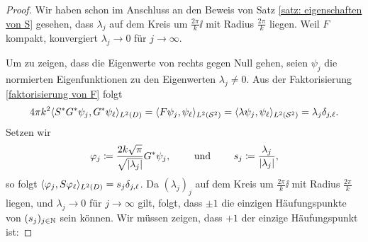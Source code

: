\begin{proof}
	Wir haben schon im Anschluss an den Beweis von Satz \ref{satz: eigenschaften von S} gesehen, dass \(\lambda_j\) auf dem Kreis um \(\frac{2\pi}{k}\ii\) mit Radius \(\frac{2\pi}{k}\) liegen. Weil \(F\) kompakt, konvergiert \(\lambda_j\to0\) für \(j\to\infty\).
	
	Um zu zeigen, dass die Eigenwerte von rechts gegen Null gehen, seien \(\psi_j\) die normierten Eigenfunktionen zu den Eigenwerten \(\lambda_j\neq0\). Aus der Faktorisierung \eqref{faktorisierung von F} folgt
	\begin{equation*}
		4\pi k^2\langle S^\ast G^\ast\psi_j,G^\ast\psi_\ell\rangle_{L^2(D)}
		=\langle F\psi_j, \psi_\ell\rangle_{L^2(\mathcal{S}^2)}
		=\langle \lambda\psi_j, \psi_\ell\rangle_{L^2(\mathcal{S}^2)}
		=\lambda_j\delta_{j,\ell}.
	\end{equation*}
	Setzen wir
	\begin{equation*}
		\varphi_j\coloneqq\frac{2k\sqrt{\pi}}{\sqrt{|\lambda_j|}}G^\ast\psi_j,\qquad\text{ und }\qquad s_j\coloneqq\frac{\lambda_j}{|\lambda_j|},
	\end{equation*}
	so folgt \(\langle \varphi_j,S\varphi_\ell\rangle_{L^2(D)}=s_j\delta_{j,\ell}\). Da \((\lambda_j)_j\) auf dem Kreis um \(\frac{2\pi}{k}\ii\) mit Radius \(\frac{2\pi}{k}\) liegen, und \(\lambda_j\to0\) für \(j\to\infty\) gilt, folgt, dass \(\pm1\) die einzigen Häufungspunkte von \((s_j)_{j\in\mathbb{N}}\) sein können. Wir müssen zeigen, dass \(+1\) der einzige Häufungspunkt ist:\vspace{1.5mm}
		

\end{proof}

